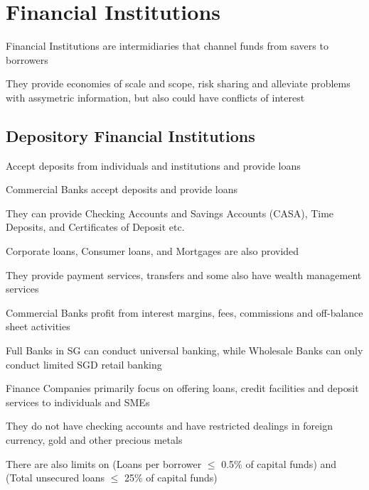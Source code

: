 \section{Financial Institutions}
Financial Institutions are intermidiaries that channel funds 
from savers to borrowers

They provide economies of scale and scope, risk sharing and alleviate
problems with assymetric information, but also could have conflicts of interest

\subsection{Depository Financial Institutions}
Accept deposits from individuals and institutions and provide loans

Commercial Banks accept deposits and provide loans

They can provide Checking Accounts and Savings Accounts (CASA), Time Deposits, and Certificates of Deposit etc.

Corporate loans, Consumer loans, and Mortgages are also provided

They provide payment services, transfers and some also have wealth management services

Commercial Banks profit from interest margins, fees, commissions and off-balance sheet activities

\begin{callout}
    Full Banks in SG can conduct universal banking, while Wholesale Banks can only conduct limited SGD retail banking
\end{callout}

Finance Companies primarily focus on offering loans, credit facilities and deposit services to individuals and SMEs

They do not have checking accounts and have restricted dealings in foreign currency, gold and other precious metals

There are also limits on (Loans per borrower $\leq$ 0.5\% of capital funds) and (Total unsecured loans $\leq$ 25\% of capital funds)

